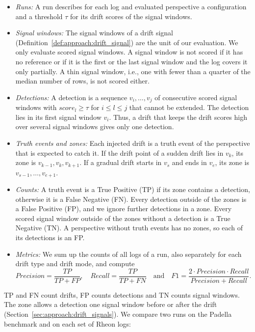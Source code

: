 \begin{itemize}
	\item \emph{Runs:} A run describes for each log and evaluated perspective a configuration and a threshold $\tau$ for its drift scores of the signal windows.
	\item \emph{Signal windows:} The signal windows of a drift signal (Definition~\ref{def:approach:drift_signal}) are the unit of our evaluation. We only evaluate scored signal windows. A signal window is not scored if it has no reference or if it is the first or the last signal window and the log covers it only partially. A thin signal window, i.e., one with fewer than a quarter of the median number of rows, is not scored either.
	\item \emph{Detections:} A detection is a sequence $v_i, \dots, v_j$ of consecutive scored signal windows with $\mathit{score}_l \ge \tau$ for $i \le l \le j$ that cannot be extended. The detection lies in its first signal window $v_i$. Thus, a drift that keeps the drift scores high over several signal windows gives only one detection.
	\item \emph{Truth events and zones:} Each injected drift is a truth event of the perspective that is expected to catch it. If the drift point of a sudden drift lies in $v_k$, its zone is $v_{k-1}, v_k, v_{k+1}$. If a gradual drift starts in $v_s$ and ends in $v_e$, its zone is $v_{s-1}, \dots, v_{e+1}$.
	\item \emph{Counts:} A truth event is a True Positive (TP) if its zone contains a detection, otherwise it is a False Negative (FN). Every detection outside of the zones is a False Positive (FP), and we ignore further detections in a zone. Every scored signal window outside of the zones without a detection is a True Negative (TN). A perspective without truth events has no zones, so each of its detections is an FP.
	\item \emph{Metrics:} We sum up the counts of all logs of a run, also separately for each drift type and drift mode, and compute
	      \[
		      \mathit{Precision} = \frac{\mathit{TP}}{\mathit{TP} + \mathit{FP}}, \quad \mathit{Recall} = \frac{\mathit{TP}}{\mathit{TP} + \mathit{FN}} \quad\text{and}\quad \mathit{F1} = \frac{2 \cdot \mathit{Precision} \cdot \mathit{Recall}}{\mathit{Precision} + \mathit{Recall}}.
	      \]
\end{itemize}
TP and FN count drifts, FP counts detections and TN counts signal windows. The zone allows a detection one signal window before or after the drift (Section~\ref{sec:approach:drift_signals}). We compare two runs on the Padella benchmark and on each set of Rheon logs:

